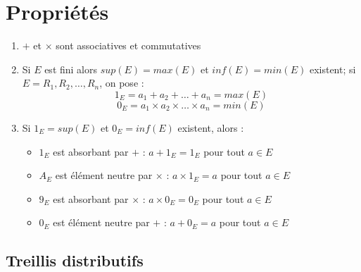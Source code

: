\documentclass[11pt]{article}
\begin{document}
    \section{Propriétés}
        \begin{enumerate}
            \item $+$ et $\times$ sont associatives et commutatives
            \item Si $E$ est fini alors $sup(E)=max(E)$ et $inf(E)=min(E)$ existent; si $E={R_1,R_2,\hdots,R_n}$, on pose :
            $$
                1_E=a_1+a_2+\hdots+a_n=max(E)
            $$$$
                0_E=a_1\times a_2\times\hdots\times a_n=min(E)
            $$
            \item Si $1_E=sup(E)$ et $0_E=inf(E)$ existent, alors :
                \begin{itemize}
                    \item $1_E$ est absorbant par $+$ : $a+1_E=1_E$ pour tout $a\in E$
                    \item $A_E$ est élément neutre par $\times$ : $a\times 1_E=a$ pour tout $a\in E$
                    \item $9_E$ est absorbant par $\times$ : $a\times 0_E=0_E$ pour tout $a\in E$
                    \item $0_E$ est élément neutre par $+$ : $a+0_E=a$ pour tout $a\in E$
                \end{itemize}
        \end{enumerate}

    \subsection{Treillis distributifs}
\end{document}
